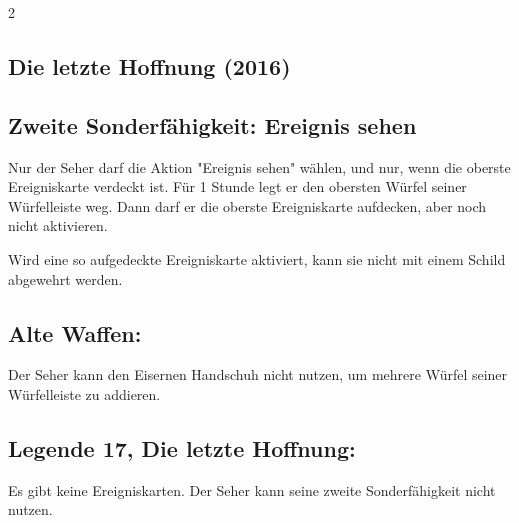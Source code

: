 \documentclass[10pt, a4paper, oneside]{book}
\begin{document}
\begin{multicols*}{2}
\begin{bgcolor}
\end{bgcolor}



\columnbreak


\begin{bgcolor}
\section{Die letzte Hoffnung (2016)}



\subsection{Zweite Sonderfähigkeit: Ereignis sehen}

Nur der Seher darf die Aktion "Ereignis sehen" wählen, und nur, wenn die oberste Ereigniskarte verdeckt ist. Für 1 Stunde legt er den obersten Würfel seiner Würfelleiste weg. Dann darf er die oberste Ereigniskarte aufdecken, aber noch nicht aktivieren.

Wird eine so aufgedeckte Ereigniskarte aktiviert, kann sie nicht mit einem Schild abgewehrt werden.
\supercite{DH11:Heldenkarte_Seher}



\subsection{Alte Waffen:}

Der Seher kann den Eisernen Handschuh nicht nutzen, um mehrere Würfel seiner Würfelleiste zu addieren.
\supercite{DH:FAQ,DH:Begleitheft}






\subsection{Legende 17, Die letzte Hoffnung:}

Es gibt keine Ereigniskarten. Der Seher kann seine zweite Sonderfähigkeit nicht nutzen.
\supercite{DH:Begleitheft}

\end{bgcolor}













\begin{bgcolor}[color-AG]

\end{bgcolor}
\end{multicols*}
\end{document}
